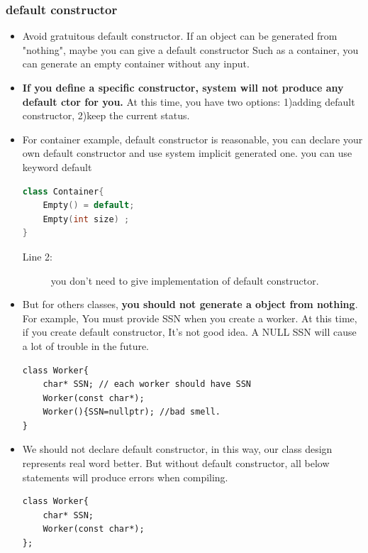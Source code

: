 \documentclass[a4paper,11pt,twoside]{book}
\begin{document}
\subsubsection{default constructor}
\begin{itemize}
	
	\item Avoid gratuitous default constructor. If an object can be generated from "nothing", maybe you can give a default constructor Such as a container, you can generate an empty container without any input. 
	
	\item \textbf{If you define a specific constructor, system will not produce any default ctor for you.} At this time, you have two options: 1)adding default constructor, 2)keep the current status.
	
	\item For container example, default constructor is reasonable, you can declare your own default constructor and use system implicit generated one. you can use keyword default
\begin{lstlisting}[frame=single, language=c++]
class Container{
	Empty() = default;
	Empty(int size) ;
}
\end{lstlisting}

	\begin{description}
		\item[Line 2:] you don't need to give implementation of default constructor.
	\end{description}
	
	
	\item But for others classes, \textbf{you should not generate a object from nothing}. For example, You must provide SSN when you create a worker. At this time, if you create default constructor, It's not good idea. A NULL SSN will cause a lot of trouble in the future. 
\begin{lstlisting}[numbers=none]
class Worker{
	char* SSN; // each worker should have SSN
	Worker(const char*);
	Worker(){SSN=nullptr); //bad smell.
}
\end{lstlisting}
	
	\item We should not declare default constructor, in this way, our class design represents real word better. But without default constructor, all below statements will produce errors when compiling.
	
\begin{lstlisting}
class Worker{
	char* SSN;
	Worker(const char*); 
};


\end{lstlisting}
\end{itemize}
\end{document}
